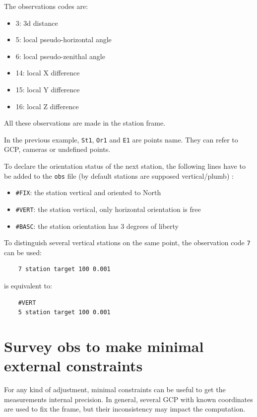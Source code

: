 The observations codes are:

\begin{itemize}
    \item 3: 3d distance
    \item 5: local pseudo-horizontal angle
    \item 6: local pseudo-zenithal angle
    \item 14: local X difference
    \item 15: local Y difference
    \item 16: local Z difference
\end{itemize}

All these observations are made in the station frame.

In the previous example, {\tt St1}, {\tt Or1} and {\tt E1} are points name.
They can refer to GCP, cameras or undefined points.

To declare the orientation status of the next station, the following lines have to be
added to the {\tt obs} file (by default stations are supposed vertical/plumb) :

\begin{itemize}
    \item \texttt{\#FIX}: the station vertical and oriented to North
    \item \texttt{\#VERT}: the station vertical, only horizontal orientation is free
    \item \texttt{\#BASC}: the station orientation has 3 degrees of liberty 
\end{itemize}

To distinguish several vertical stations on the same point, the observation code {\tt 7} can be used:

\begin{verbatim}
    7 station target 100 0.001
\end{verbatim}

is equivalent to:

\begin{verbatim}
    #VERT
    5 station target 100 0.001
\end{verbatim}


\section{Survey obs to make minimal external constraints}

For any kind of adjustment, minimal constraints can be useful to get the measurements internal precision.
In general, several GCP with known coordinates are used to fix the frame, but their inconsistency may
impact the computation.

